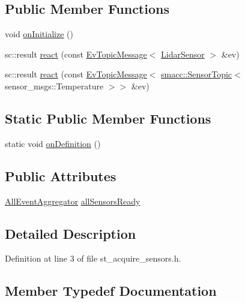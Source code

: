 \subsection*{Public Member Functions}
\begin{DoxyCompactItemize}
\item 
void \hyperlink{structStAcquireSensors_af25bdea33dab12d2c37301eb999ac6e8}{on\+Initialize} ()
\item 
sc\+::result \hyperlink{structStAcquireSensors_aa3c461ccdb69aa4c7d09b88dae21c646}{react} (const \hyperlink{structsmacc_1_1EvTopicMessage}{Ev\+Topic\+Message}$<$ \hyperlink{sensor__state_8h_a9db9e1944f88de79507758d08e4a2ee3}{Lidar\+Sensor} $>$ \&ev)
\item 
sc\+::result \hyperlink{structStAcquireSensors_af69db5f01143f5b9267fbd39fc566be8}{react} (const \hyperlink{structsmacc_1_1EvTopicMessage}{Ev\+Topic\+Message}$<$ \hyperlink{classsmacc_1_1SensorTopic}{smacc\+::\+Sensor\+Topic}$<$ sensor\+\_\+msgs\+::\+Temperature $>$$>$ \&ev)
\end{DoxyCompactItemize}
\subsection*{Static Public Member Functions}
\begin{DoxyCompactItemize}
\item 
static void \hyperlink{structStAcquireSensors_a4f638e39d921300d4dcbc9ce5fa8d1c8}{on\+Definition} ()
\end{DoxyCompactItemize}
\subsection*{Public Attributes}
\begin{DoxyCompactItemize}
\item 
\hyperlink{classAllEventAggregator}{All\+Event\+Aggregator} \hyperlink{structStAcquireSensors_adc57ee1bdc2d1622b65811366f70845b}{all\+Sensors\+Ready}
\end{DoxyCompactItemize}


\subsection{Detailed Description}


Definition at line 3 of file st\+\_\+acquire\+\_\+sensors.\+h.



\subsection{Member Typedef Documentation}
